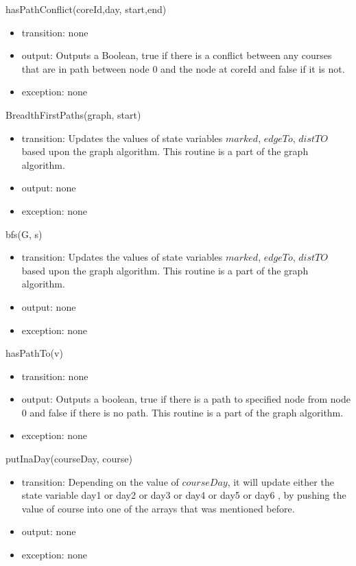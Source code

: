 \documentclass[11pt, oneside]{article}
\begin{document}
\noindent
hasPathConflict(coreId,day, start,end)
\begin{itemize}
\item transition: none
\item output: Outputs a Boolean, true if there is a conflict between any courses that are in path between node 0 and the node at coreId and false if it is not.
 \item exception: none
\end{itemize}

\noindent
BreadthFirstPaths(graph, start)
\begin{itemize}
\item transition: Updates the values of state variables $marked$, $edgeTo$, $distTO$ based upon the graph algorithm. This routine is a part of the graph algorithm.
\item output: none
 \item exception: none
\end{itemize}

\noindent
bfs(G, s)
\begin{itemize}
\item transition: Updates the values of state variables $marked$, $edgeTo$, $distTO$ based upon the graph algorithm. This routine is a part of the graph algorithm.
\item output: none
 \item exception: none
\end{itemize}

\noindent
hasPathTo(v)
\begin{itemize}
\item transition: none
\item output: Outputs a boolean, true if there is a path to specified node from node 0 and false if there is no path. This routine is a part of the graph algorithm.
\item exception: none
\end{itemize}

\noindent
putInaDay(courseDay, course)
\begin{itemize}
\item transition: Depending on the value of $courseDay$, it will update either the state variable day1 or day2 or day3 or day4 or day5 or day6 , by pushing the value of course into one of the arrays that was mentioned before.
\item output: none
\item exception: none
\end{itemize}
\end{document}
